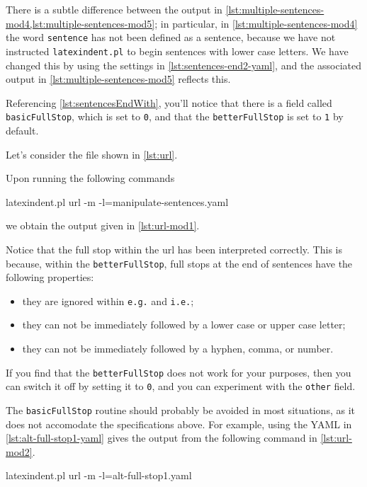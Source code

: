 	There is a subtle difference between the output in \cref{lst:multiple-sentences-mod4,lst:multiple-sentences-mod5}; in particular, in \cref{lst:multiple-sentences-mod4} the word \texttt{sentence} has not been defined as a sentence, because we have not instructed \texttt{latexindent.pl} to begin sentences with lower case letters.
	We have changed this by using the settings in \cref{lst:sentences-end2-yaml}, and the associated output in \cref{lst:multiple-sentences-mod5} reflects this.

	Referencing \vref{lst:sentencesEndWith}, you'll notice that there is a field called \texttt{basicFullStop}, which is set to \texttt{0}, and that the \texttt{betterFullStop} is set to \texttt{1} by default.

	Let's consider the file shown in \cref{lst:url}.


	Upon running the following commands \begin{commandshell}
latexindent.pl url -m -l=manipulate-sentences.yaml
\end{commandshell} we obtain the output given in \cref{lst:url-mod1}.


	Notice that the full stop within the url has been interpreted correctly.
	This is because, within the \texttt{betterFullStop}, full stops at the end of sentences have the following properties: \begin{itemize} \item they are ignored within \texttt{e.g.} and \texttt{i.e.};
		\item they can not be immediately followed by a lower case or upper case letter;
		\item they can not be immediately followed by a hyphen, comma, or number.
	\end{itemize}
	If you find that the \texttt{betterFullStop} does not work for your purposes, then you can switch it off by setting it to \texttt{0}, and you can experiment with the \texttt{other} field.

	The \texttt{basicFullStop} routine should probably be avoided in most situations, as it does not accomodate the specifications above.
	For example, using the YAML in \cref{lst:alt-full-stop1-yaml} gives the output from the following command in \cref{lst:url-mod2}.
	\begin{commandshell}
latexindent.pl url -m -l=alt-full-stop1.yaml
\end{commandshell}

